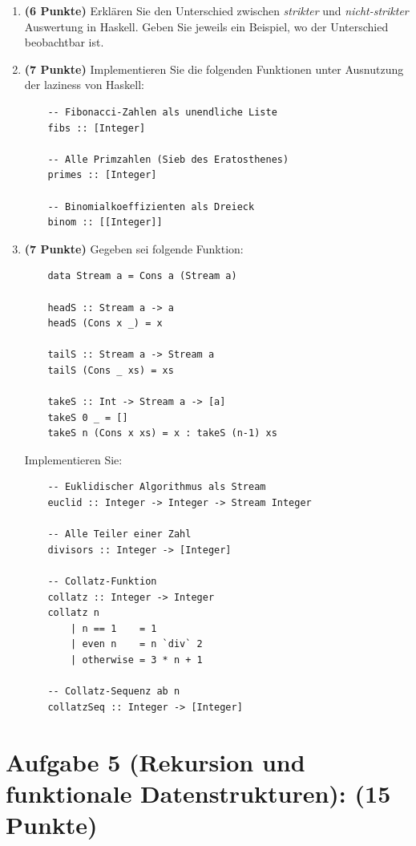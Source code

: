 \documentclass[12pt,a4paper]{article}
\makeatletter
\def\cleardoublepage{\clearpage\if@twoside\ifodd\c@page\else%
\hbox{}%
\thispagestyle{empty}%
\newpage%
\if@twocolumn\hbox{}\newpage\fi\fi\fi}
\makeatother
\begin{document}
\begin{enumerate}
    \item \textbf{(6 Punkte)} Erklären Sie den Unterschied zwischen \emph{strikter} und \emph{nicht-strikter} Auswertung in Haskell. Geben Sie jeweils ein Beispiel, wo der Unterschied beobachtbar ist.
    
    \item \textbf{(7 Punkte)} Implementieren Sie die folgenden Funktionen unter Ausnutzung der laziness von Haskell:
    \begin{verbatim}
    -- Fibonacci-Zahlen als unendliche Liste
    fibs :: [Integer]
    
    -- Alle Primzahlen (Sieb des Eratosthenes)
    primes :: [Integer]
    
    -- Binomialkoeffizienten als Dreieck
    binom :: [[Integer]]
    \end{verbatim}
    
    \item \textbf{(7 Punkte)} Gegeben sei folgende Funktion:
    \begin{verbatim}
    data Stream a = Cons a (Stream a)
    
    headS :: Stream a -> a
    headS (Cons x _) = x
    
    tailS :: Stream a -> Stream a
    tailS (Cons _ xs) = xs
    
    takeS :: Int -> Stream a -> [a]
    takeS 0 _ = []
    takeS n (Cons x xs) = x : takeS (n-1) xs
    \end{verbatim}
    
    Implementieren Sie:
    \begin{verbatim}
    -- Euklidischer Algorithmus als Stream
    euclid :: Integer -> Integer -> Stream Integer
    
    -- Alle Teiler einer Zahl
    divisors :: Integer -> [Integer]
    
    -- Collatz-Funktion
    collatz :: Integer -> Integer
    collatz n
        | n == 1    = 1
        | even n    = n `div` 2
        | otherwise = 3 * n + 1
    
    -- Collatz-Sequenz ab n
    collatzSeq :: Integer -> [Integer]
    \end{verbatim}
\end{enumerate}

\cleardoublepage

\section*{Aufgabe 5 (Rekursion und funktionale Datenstrukturen): (15 Punkte)}
\end{document}
